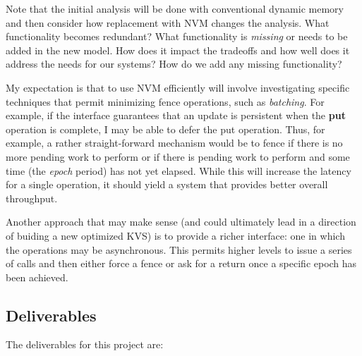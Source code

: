 \documentclass[letterpaper,twocolumn,10pt]{article}
\begin{document}
Note that the initial analysis will be done with conventional dynamic memory and then consider how replacement with NVM changes the analysis.
What functionality becomes redundant?  What functionality is \textit{missing} or needs to be added in the new model.  How does it impact the tradeoffs and
how well does it address the needs for our systems?  How do we add any missing functionality?

My expectation is that to use NVM efficiently will involve investigating specific techniques that permit minimizing fence operations, such as 
\textit{batching}. For example, if the
interface guarantees that an update is persistent when the \textbf{put} operation is complete, I may be able to defer the put operation.  Thus,
for example, a rather straight-forward mechanism would be to fence if there is no more pending work to perform or if there is pending work to
perform and some time (the \textit{epoch} period) has not yet elapsed.  While this will increase the latency for a single operation, it should
yield a system that provides better overall throughput.

Another approach that may make sense (and could ultimately lead in a direction of buiding a new optimized KVS) is to provide a richer interface: one in which the operations may be asynchronous.  This permits higher levels to issue a series of calls and then either force a fence or ask for a return once
a specific epoch has been achieved.

\subsection{Deliverables}

The deliverables for this project are:
\end{document}
